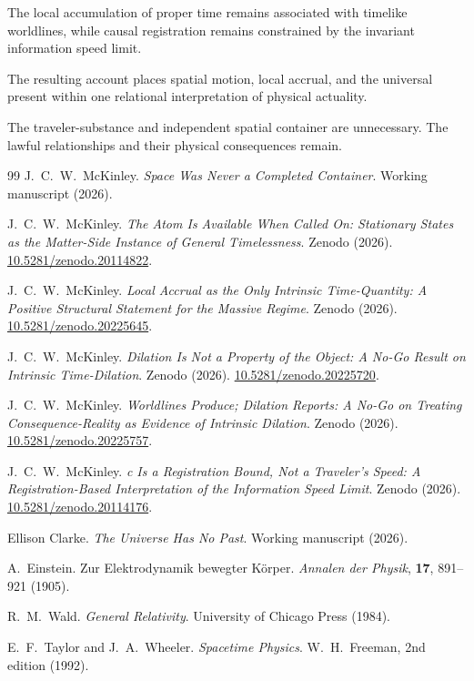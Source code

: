 \documentclass[12pt,onecolumn]{article}
\newcommand{\doi}[1]{\href{https://doi.org/#1}{#1}}
\begin{document}
The local accumulation of proper time remains associated with timelike worldlines, while causal registration remains constrained by the invariant information speed limit.

The resulting account places spatial motion, local accrual, and the universal present within one relational interpretation of physical actuality.

The traveler-substance and independent spatial container are unnecessary. The lawful relationships and their physical consequences remain.

\begin{thebibliography}{99}
J.~C.~W.~McKinley.
\newblock \emph{Space Was Never a Completed Container}.
\newblock Working manuscript (2026).

J.~C.~W.~McKinley.
\newblock \emph{The Atom Is Available When Called On: Stationary States as the Matter-Side Instance of General Timelessness}.
\newblock Zenodo (2026).
\newblock \doi{10.5281/zenodo.20114822}.

J.~C.~W.~McKinley.
\newblock \emph{Local Accrual as the Only Intrinsic Time-Quantity: A Positive Structural Statement for the Massive Regime}.
\newblock Zenodo (2026).
\newblock \doi{10.5281/zenodo.20225645}.

J.~C.~W.~McKinley.
\newblock \emph{Dilation Is Not a Property of the Object: A No-Go Result on Intrinsic Time-Dilation}.
\newblock Zenodo (2026).
\newblock \doi{10.5281/zenodo.20225720}.

J.~C.~W.~McKinley.
\newblock \emph{Worldlines Produce; Dilation Reports: A No-Go on Treating Consequence-Reality as Evidence of Intrinsic Dilation}.
\newblock Zenodo (2026).
\newblock \doi{10.5281/zenodo.20225757}.

J.~C.~W.~McKinley.
\newblock \emph{c Is a Registration Bound, Not a Traveler's Speed: A Registration-Based Interpretation of the Information Speed Limit}.
\newblock Zenodo (2026).
\newblock \doi{10.5281/zenodo.20114176}.

Ellison Clarke.
\newblock \emph{The Universe Has No Past}.
\newblock Working manuscript (2026).

A.~Einstein.
\newblock Zur Elektrodynamik bewegter K{\"o}rper.
\newblock \emph{Annalen der Physik}, \textbf{17}, 891--921 (1905).

R.~M.~Wald.
\newblock \emph{General Relativity}.
\newblock University of Chicago Press (1984).

E.~F.~Taylor and J.~A.~Wheeler.
\newblock \emph{Spacetime Physics}.
\newblock W.~H.~Freeman, 2nd edition (1992).
\end{thebibliography}
\end{document}
